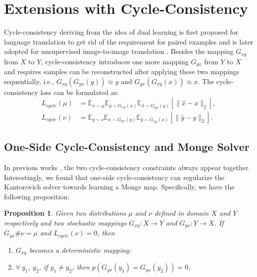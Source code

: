 \documentclass[runningheads]{llncs}
\newtheorem{prop}{Proposition}
\begin{document}
\section{Extensions with Cycle-Consistency}

Cycle-consistency deriving from the idea of dual learning \cite{duallearning} is first proposed for language translation to get rid of the requirement for paired examples and is later adopted for unsupervised image-to-image translation \cite{cyclegan,dualgan,disco}. Besides the mapping $G_{xy}$ from $X$ to $Y$, cycle-consistency introduces one more mapping $G_{yx}$ from $Y$ to $X$ and requires samples can be reconstructed after applying these two mappings sequentially, i.e., $G_{xy}(G_{yx}(y)) \approx y$ and $G_{yx}(G_{xy}(x)) \approx x$. 
The cycle-consistency loss can be formulated as:
\begin{equation}
\label{eq_one_side}
\begin{aligned}
L_{cycle}(\mu) & = \mathbb{E}_{x \sim \mu} \mathbb{E}_{y \sim G_{xy}(x)} \mathbb{E}_{\hat{x} \sim G_{yx}(y)}  [\|\hat{x} - x\|_2], \\
L_{cycle}(\nu) & = \mathbb{E}_{y \sim \nu} \mathbb{E}_{x \sim G_{yx}(y)} \mathbb{E}_{\hat{y} \sim G_{xy}(x)} [\|\hat{y} - y\|_2]. \end{aligned}
\end{equation} 

\subsection{One-Side Cycle-Consistency and Monge Solver}
\label{cycle-consistency loss}

In previous works \cite{cyclegan}, the two cycle-consistency constraints always appear together. Interestingly, we found that one-side cycle-consistency can regularize the Kantorovich solver towards learning a Monge map. Specifically, we have the following proposition: 
\begin{prop}
	\label{one-side cycle-consistency}
	Given two distributions $\mu$ and $\nu$ defined in domain $X$ and $Y$ respectively and two stochastic mappings $G_{xy}: X \rightarrow Y $ and $G_{yx}: Y \rightarrow X$. If $G_{yx}\#\nu = \mu$ and $L_{cycle}(\nu)=0$, then 
	\begin{enumerate}
		\item $G_{xy}$ becomes a deterministic mapping;
		\item $\forall ~ y_1$, $y_2$, if $y_1 \neq y_2$, then $p(G_{yx}(y_1)=G_{yx}(y_2))=0$.
	\end{enumerate}
\end{prop}
\end{document}
